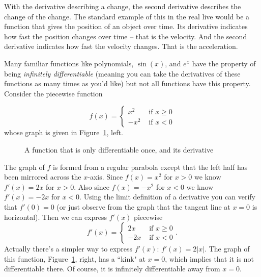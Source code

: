 With the derivative describing a change, the second derivative describes the
change of the change. The standard example of this in the real live would be
a function that gives the position of an object over time. Its derivative
indicates how fast the position changes over time -- that is the velocity.
And the second derivative indicates how fast the velocity changes. That is
the acceleration.

\begin{bsp}

Many familiar functions like polynomials, $\sin(x)$, and $e^x$ have the property
of being \textit{infinitely differentiable} (meaning you can take the
derivatives of these functions as many times as you'd like) but not all
functions have this property. Consider the piecewise function

\[
f(x) = \begin{cases}
x^2 & \text{ if }x \geq 0 \\
-x^2 & \text{ if }x < 0
\end{cases}\]
whose graph is given in Figure~\ref{tnex2figs}, left.

\begin{figure}
\begin{center}
\qquad
\end{center}
\caption{A function that is only differentiable once, and its derivative}
\label{tnex2figs}
\end{figure}

The graph of $f$ is formed from a regular parabola except that the left half
has been mirrored across the $x$-axis. Since $f(x) = x^2$ for $x>0$ we know
$f'(x) = 2x$ for $x>0$. Also since $f(x) = -x^2$ for $x<0$ we know $f'(x) =
-2x$ for $x<0$. Using the limit definition of a derivative you can verify
that $f'(0) = 0$ (or just observe from the graph that the tangent line at
$x=0$ is horizontal). Then we can express $f'(x)$ piecewise
\[f'(x) = \begin{cases}
2x & \text{ if }x \geq 0 \\
-2x & \text{ if }x < 0
\end{cases}.\]
Actually there's a simpler way to express $f'(x)$: $f'(x) = 2|x|$. The graph
of this function, Figure~\ref{tnex2figs}, right,
has a ``kink" at $x=0$, which implies that it is not differentiable there. 
Of course, it is infinitely differentiable away from $x=0$.
\end{bsp}
